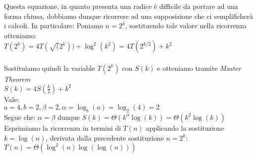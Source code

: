\documentclass[../cheatSheetAlgoritmi.tex]{subfiles}
\begin{document}
Questa equazione, in quanto presenta una radice è difficile da portare ad una forma chiusa, dobbiamo dunque ricorrere ad una supposizione che ci semplificherà i calcoli. In particolare:
Poniamo $n = 2^k$, sostituendo tale valore nella ricorrenza otteniamo:\\
$T(2^k) = 4T(\sqrt(2^k)) + \log^{2}(k^2)= 4T(2^{k/2}) + k^2$\\\\
Sostituiamo quindi la variable $T(2^k)$ con $S(k)$ e otteniamo tramite \textit{Master Theorem}\\
$S(k) = 4S(\frac{k}{2}) +k^2$ \\
Vale:\\
$a = 4, b = 2, \beta = 2, \alpha = \log_b(a) = \log_2(4) = 2$\\
Segue che: $\alpha = \beta$ dunque $S(k) = \Theta(k^\alpha \log(k)) = \Theta(k^2 \log(k))$\\
Esprimiamo la ricorrenza in termini di $T(n)$ applicando la sostituzione $k = \log(n)$, derivata dalla precedente sostituzione $n = 2^k$:\\
$T(n) = \Theta(\log^2(n)\log(\log(n)))$

\newpage
\end{document}
